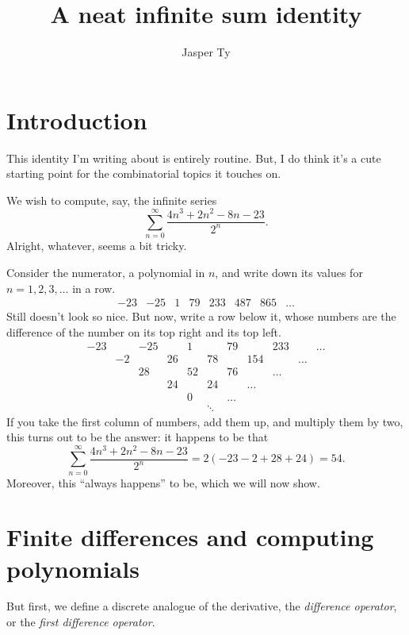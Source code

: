 \documentclass{article}
\title{A neat infinite sum identity}
\author{Jasper Ty}
\date{}
\begin{document}
\maketitle

\tableofcontents

\section{Introduction}

This identity I'm writing about is entirely routine. But, I do think it's a cute starting point for the combinatorial topics it touches on.

We wish to compute, say, the infinite series
\[
    \sum_{n=0}^\infty \frac{4n^3 + 2n^2 - 8n - 23}{2^n}.
\]
Alright, whatever, seems a bit tricky.

Consider the numerator, a polynomial in $n$, and write down its values for $n=1,2,3,\ldots$ in a row.
\[
    \begin{matrix}
        -23 & -25 & 1 & 79 & 233 & 487 & 865 & \ldots
    \end{matrix}
\]
Still doesn't look so nice.
But now, write a row below it, whose numbers are the difference of the number on its top right and its top left.
\[
    \begin{matrix}
        -23 & & -25 & & 1 & & 79 & & 233 & & \ldots \\
        & -2 & & 26 & & 78 & & 154 & & \ldots \\
        & & 28 & & 52 & & 76 & & \ldots \\
        & & & 24 & & 24 & & \ldots \\
        & & & & 0 & & \ldots \\
        & & & & & \ddots 
    \end{matrix}
\]
If you take the first column of numbers, add them up, and multiply them by two, this turns out to be the answer:
it happens to be that
\[
    \sum_{n=0}^\infty \frac{4n^3 + 2n^2 - 8n - 23}{2^n} = 2(-23-2+28+24) = 54.
\]
Moreover, this ``always happens'' to be, which we will now show.

\section{Finite differences and computing polynomials}

But first, we define a discrete analogue of the derivative, the \textit{difference operator}, or the \textit{first difference operator}.
\end{document}
